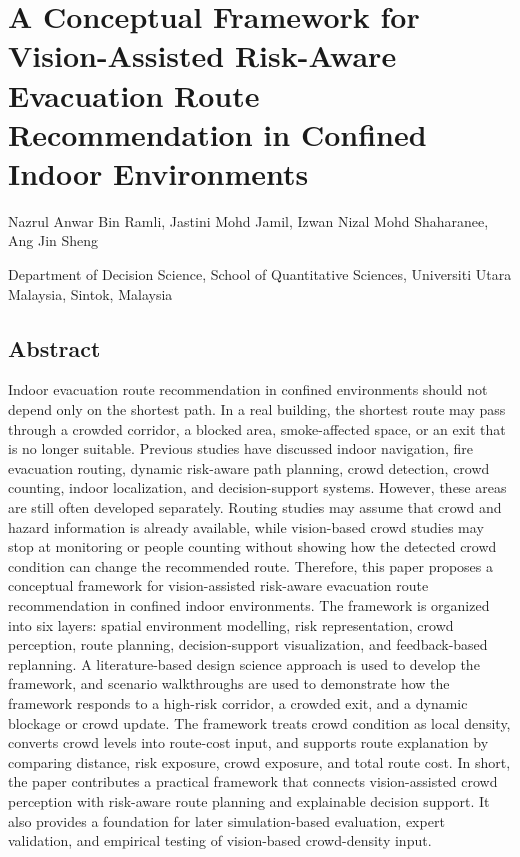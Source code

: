 \documentclass[
]{article}
\author{}
\date{}
\begin{document}
\section{A Conceptual Framework for Vision-Assisted Risk-Aware
Evacuation Route Recommendation in Confined Indoor
Environments}\label{a-conceptual-framework-for-vision-assisted-risk-aware-evacuation-route-recommendation-in-confined-indoor-environments}

Nazrul Anwar Bin Ramli, Jastini Mohd Jamil, Izwan Nizal Mohd Shaharanee,
Ang Jin Sheng

Department of Decision Science, School of Quantitative Sciences,
Universiti Utara Malaysia, Sintok, Malaysia

\subsection{Abstract}\label{abstract}

Indoor evacuation route recommendation in confined environments should
not depend only on the shortest path. In a real building, the shortest
route may pass through a crowded corridor, a blocked area,
smoke-affected space, or an exit that is no longer suitable. Previous
studies have discussed indoor navigation, fire evacuation routing,
dynamic risk-aware path planning, crowd detection, crowd counting,
indoor localization, and decision-support systems. However, these areas
are still often developed separately. Routing studies may assume that
crowd and hazard information is already available, while vision-based
crowd studies may stop at monitoring or people counting without showing
how the detected crowd condition can change the recommended route.
Therefore, this paper proposes a conceptual framework for
vision-assisted risk-aware evacuation route recommendation in confined
indoor environments. The framework is organized into six layers: spatial
environment modelling, risk representation, crowd perception, route
planning, decision-support visualization, and feedback-based replanning.
A literature-based design science approach is used to develop the
framework, and scenario walkthroughs are used to demonstrate how the
framework responds to a high-risk corridor, a crowded exit, and a
dynamic blockage or crowd update. The framework treats crowd condition
as local density, converts crowd levels into route-cost input, and
supports route explanation by comparing distance, risk exposure, crowd
exposure, and total route cost. In short, the paper contributes a
practical framework that connects vision-assisted crowd perception with
risk-aware route planning and explainable decision support. It also
provides a foundation for later simulation-based evaluation, expert
validation, and empirical testing of vision-based crowd-density input.
\end{document}
